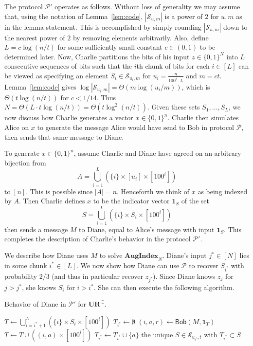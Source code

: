 \documentclass[11pt]{article}
\newcommand{\diane}{\mathsf{Diane}}
\newcommand{\query}{\mathsf{Bob}}
\newcommand{\aug}{\mathbf{AugIndex}\xspace}
\newcommand{\ur}{\mathbf{UR}\xspace}
\begin{document}
The protocol $\mathcal P'$ operates as follows. Without loss of generality we may assume that, using the notation of Lemma~\ref{lem:code}, $|\mathcal S_{u,m}|$ is a power of $2$ for $u, m$ as in the lemma statement. This is accomplished by simply rounding $|\mathcal S_{u,m}|$ down to the nearest power of $2$ by removing elements arbitrarily. Also, define $L = c\log(n/t)$ for some sufficiently small constant $c\in(0,1)$ to be determined later. Now, Charlie partitions the bits of his input $z\in\{0,1\}^N$ into $L$ consecutive sequences of bits such that the $i$th chunk of bits for each $i\in[L]$ can be viewed as specifying an element $S_i\in \mathcal S_{u_i,m}$ for $u_i = \frac n{100^i\cdot L}$ and $m = ct$. Lemma~\ref{lem:code} gives $\log|\mathcal S_{u_i,m}| = \Theta(m\log(u_i/m))$, which is $\Theta(t\log(n/t))$ for $c < 1/14$. Thus $N = \Theta(L\cdot t\log(n/t)) = \Theta(t\log^2(n/t))$. Given these sets $S_1,\ldots,S_L$, we now discuss how Charlie generates a vector $x\in\{0,1\}^n$. Charlie then simulates Alice on $x$ to generate the message Alice would have send to Bob in protocol $\mathcal P$, then sends that same message to Diane.

To generate $x\in\{0,1\}^n$, assume Charlie and Diane have agreed on an arbitrary bijection from 
$$A = \bigcup_{i=1}^L (\{i\} \times [u_i]\times [100^i])$$
to $[n]$. This is possible since $|A| = n$. Henceforth we think of $x$ as being indexed by $A$. Then Charlie defines $x$ to be the indicator vector $\mathbf{1}_S$ of the set
$$
S = \bigcup_{i=1}^L (\{i\} \times S_i \times [100^i]) 
$$
then sends a message $M$ to Diane, equal to Alice's message with input $\mathbf{1}_S$. This completes the description of Charlie's behavior in the protocol $\mathcal P'$.

We describe how Diane uses $M$ to solve $\aug_N$. Diane's input $j^*\in[N]$ lies in some chunk $i^*\in[L]$. We now show how Diane can use $\mathcal P$ to recover $S_{i^*}$ with probability $2/3$ (and thus in particular recover $z_{j^*}$). Since Diane knows $z_j$ for $j>j^*$, she knows $S_i$ for $i>i^*$. She can then execute the following algorithm.

\begin{algorithm}[H] 
  \caption{Behavior of Diane in $\mathcal P'$ for $\ur^\subset$.} \label{algo:diane1}
  \begin{algorithmic}[1]
    \Procedure{$\diane$}{$M$}
    \State $T \leftarrow \bigcup_{i=i^*+1}^L (\{i\} \times S_i \times [100^i])$
    \State $T_{i^*}\leftarrow \emptyset$
      \State $(i,a,r)\leftarrow \query(M, \mathbf{1}_T)$
      \State $T\leftarrow T \cup ((i,a) \times [100^i])$
        \State $T_{i^*} \leftarrow T_{i^*}\cup \{a\}$
      \EndIf
    \EndWhile
    \State \Return the unique $S\in \mathcal S_{u_{i^*},t}$ with $T_{i^*}\subset S$ 
    \EndProcedure
  \end{algorithmic}
\end{algorithm}
\end{document}

